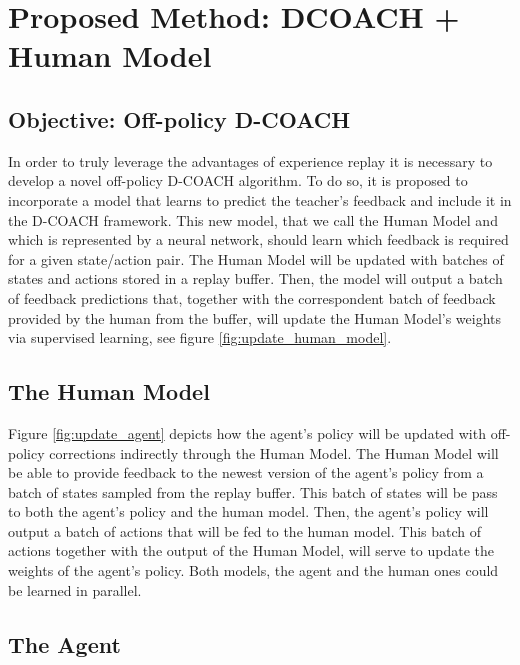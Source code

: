 \chapter{Proposed Method: DCOACH + Human Model}
\label{chapter:Proposed Method}

\section{Objective: Off-policy D-COACH}
\label{section:Objective: Off-policy D-COACH}


In order to truly leverage the advantages of experience replay it is necessary  to develop a novel off-policy D-COACH algorithm. To do so, it is proposed to incorporate a model that learns to predict the teacher’s feedback and include it in the D-COACH framework. This new model, that we call the Human Model and which is represented by a neural network, should learn which feedback is required for a given state/action pair. The Human Model will be updated with batches of states and actions stored in a replay buffer. Then, the model will output a batch of feedback predictions that, together with the correspondent batch of feedback provided by the human from the buffer, will update the Human Model's weights via supervised learning, see figure \ref{fig:update_human_model}. 





\section{The Human Model}
\label{section:The Human Model}


Figure \ref{fig:update_agent} depicts how the agent's policy will be updated with off-policy corrections indirectly through the Human Model. The Human Model will be able to provide feedback to the newest version of the agent’s policy from a batch of states sampled from the replay buffer. This batch of states will be pass to both the agent's policy and the human model. Then, the agent's policy will output a batch of actions that will be fed to the human model. This batch of actions together with the output of the Human Model, will serve to update the weights of the agent's policy. Both models, the agent and the human ones could be learned in parallel.


\section{The Agent}
\label{section:The Human Model}







